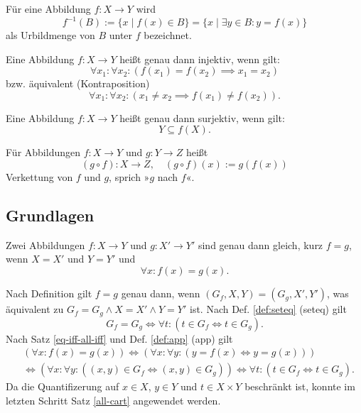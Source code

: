 \begin{Definition}\label{def:preimg}
Für eine Abbildung $f\colon X\to Y$ wird
\[f^{-1}(B) := \{x\mid f(x)\in B\} = \{x\mid \exists y\in B\colon y=f(x)\}\]
als Urbildmenge von $B$ unter $f$ bezeichnet.
\end{Definition}

\begin{Definition}%
\label{def:inj}\newlinefirst
Eine Abbildung $f\colon X\to Y$ heißt genau dann injektiv, wenn gilt:%
\[\forall x_1\colon \forall x_2\colon (f(x_1)=f(x_2)\implies x_1=x_2)\]
bzw. äquivalent (Kontraposition)
\[\forall x_1\colon \forall x_2\colon (x_1\ne x_2\implies f(x_1)\ne f(x_2)).\]
\end{Definition}

\begin{Definition}%
\label{def:sur}\newlinefirst
Eine Abbildung $f\colon X\to Y$ heißt genau dann surjektiv, wenn gilt:%
\[Y\subseteq f(X).\]
\end{Definition}

\begin{Definition}\label{def:composition}%
\newlinefirst
Für Abbildungen $f\colon X\to Y$ und $g\colon Y\to Z$ heißt%
\[(g\circ f)\colon X\to Z,\quad (g\circ f)(x):=g(f(x))\]
Verkettung von $f$ und $g$, sprich »$g$ nach $f$«.
\end{Definition}

\subsection{Grundlagen}
\begin{Satz}%
\label{feq}
Zwei Abbildungen $f\colon X\to Y$ und $g\colon X'\to Y'$ sind genau
dann gleich, kurz $f=g$, wenn $X=X'$ und $Y=Y'$ und%
\[\forall x\colon f(x)=g(x).\]
\end{Satz}

\begin{Beweis}
Nach Definition gilt $f=g$ genau dann, wenn $(G_f,X,Y)=(G_g,X',Y')$,
was äquivalent zu $G_f=G_g\land X=X'\land Y=Y'$ ist. Nach Def.
\ref{def:seteq} (seteq) gilt%
\[G_f=G_g\iff \forall t\colon (t\in G_f\Leftrightarrow t\in G_g).\]
Nach Satz \ref{eq-iff-all-iff} und Def. \ref{def:app} (app) gilt
\begin{align*}
&(\forall x\colon f(x)=g(x)) \iff (\forall x\colon\forall y\colon (y=f(x)\Leftrightarrow y=g(x)))\\
&\iff (\forall x\colon\forall y\colon((x,y)\in G_f\Leftrightarrow (x,y)\in G_g))
\iff \forall t\colon (t\in G_f\Leftrightarrow t\in G_g).
\end{align*}
Da die Quantifizerung auf $x\in X$, $y\in Y$ und $t\in X\times Y$
beschränkt ist, konnte im letzten Schritt Satz \ref{all-cart}
angewendet werden.\;\qedsymbol
\end{Beweis}

